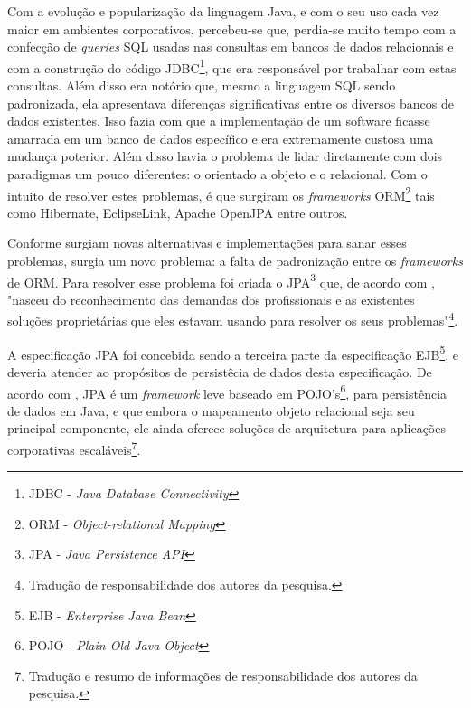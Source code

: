 
	\par Com a evolução e popularização da linguagem Java, e com o seu
uso cada vez maior em ambientes corporativos, percebeu-se que, perdia-se muito
tempo com a confecção de \textit{queries} SQL usadas nas consultas em bancos de
dados relacionais e com a construção do código JDBC\footnote{JDBC -
\textit{Java Database Connectivity}}, que era responsável por trabalhar com
estas consultas. Além disso era notório que, mesmo a linguagem SQL sendo
padronizada, ela apresentava diferenças significativas entre os diversos bancos
de dados existentes. Isso fazia com que a implementação de um software ficasse
amarrada em um banco de dados específico e era extremamente custosa uma mudança
poterior. Além disso havia o problema de lidar diretamente com dois paradigmas
um pouco diferentes: o orientado a objeto e o relacional. Com o intuito de
resolver estes problemas, é que surgiram os \textit{frameworks}
ORM\footnote{ORM - \textit{Object-relational Mapping}} tais como Hibernate,
EclipseLink, Apache OpenJPA entre outros.

	\par Conforme surgiam novas alternativas e implementações para sanar esses
problemas, surgia um novo problema: a falta de padronização entre os
\textit{frameworks} de ORM. Para resolver esse problema foi criada o
JPA\footnote{JPA - \textit{Java Persistence API}} que, de acordo com
, "nasceu do reconhecimento das demandas dos
profissionais e as existentes soluções proprietárias que eles estavam usando
para resolver os seus problemas"\footnote{Tradução de responsabilidade dos
autores da pesquisa.}. 
	
	\par A especificação JPA foi concebida sendo a terceira parte da
especificação EJB\footnote{EJB - \textit{Enterprise Java Bean}}, e deveria
atender ao propósitos de persistêcia de dados desta especificação.
De acordo com , JPA é um \textit{framework} leve
baseado em POJO's\footnote{POJO - \textit{Plain Old Java Object }}, para
persistência de dados em Java, e que embora o mapeamento objeto
relacional seja seu principal componente, ele ainda oferece soluções de
arquitetura para aplicações corporativas escaláveis\footnote{Tradução e resumo
de informações de responsabilidade dos autores da pesquisa.}.

